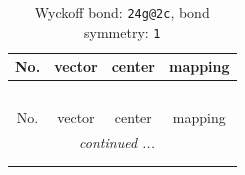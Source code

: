 \documentclass[fleqn,8pt]{jsarticle}
\begin{document}
\renewcommand{\arraystretch}{1.2}
\begin{longtable}{cccc}
\caption{Wyckoff bond: {\tt 24g@2c}, bond symmetry: {\tt 1}}
 \\
 \hline \hline
No. & vector & center & mapping \\ \hline \endfirsthead

\multicolumn{3}{l}{\tablename\ \thetable{}} \\
 \hline \hline
No. & vector & center & mapping \\ \hline \endhead

 \hline \hline
\multicolumn{3}{r}{\footnotesize\it continued ...} \\ \endfoot

 \hline \hline
\multicolumn{3}{r}{} \\ \endlastfoot


\end{longtable}
\end{document}
